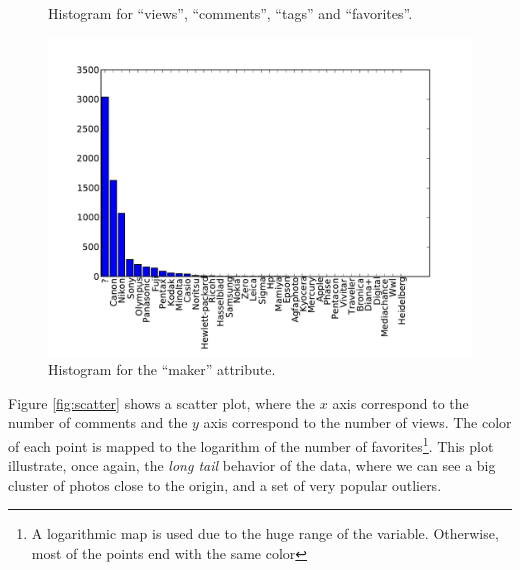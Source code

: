 \documentclass[letter,12pt]{article}
\begin{document}
\begin{figure}[!h]
{}
\caption{Histogram for ``views'', ``comments'', ``tags'' and ``favorites''.}
\label{fig:histo_numerical}
\end{figure}

\begin{figure}[!h]
\centering
\includegraphics[scale=0.6]{histo_make.pdf} 
\caption{Histogram for the ``maker'' attribute.}
\label{fig:histo_make}
\end{figure}

Figure \ref{fig:scatter} shows a scatter plot, where the $x$ axis correspond to the number of comments and the $y$ axis correspond to the number of views. The color of each point is mapped to the logarithm of the number of favorites\footnote{A logarithmic map is used due to the huge range of the variable. Otherwise, most of the points end with the same color}. This plot illustrate, once again, the \emph{long tail} behavior of the data, where we can see a big cluster of photos close to the origin, and a set of very popular outliers.
\end{document}
